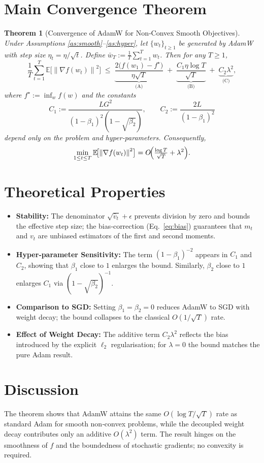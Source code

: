\documentclass{article}
\newtheorem{theorem}{Theorem}
\newcommand{\EE}{\mathbb{E}}
\newcommand{\norm}[1]{\left\|#1\right\|}
\begin{document}
\section*{Main Convergence Theorem}
\begin{theorem}[Convergence of AdamW for Non‑Convex Smooth Objectives]\label{thm:main}
Under Assumptions \ref{as:smooth}–\ref{as:hyper}, let $\{w_t\}_{t\ge1}$ be generated by AdamW with step size $\eta_t=\eta/\sqrt{t}$.
Define $\displaystyle \bar w_T:=\frac{1}{T}\sum_{t=1}^{T} w_t$.
Then for any $T\ge 1$,
\[
\frac{1}{T}\sum_{t=1}^{T}\EE\!\bigl[\norm{\nabla f(w_t)}^2\bigr]
\;\le\;
\underbrace{\frac{2\bigl(f(w_1)-f^\star\bigr)}{\eta\sqrt{T}}}_{\text{(A)}}
\;+\;
\underbrace{\frac{C_1\eta\log T}{\sqrt{T}}}_{\text{(B)}}
\;+\;
\underbrace{C_2\lambda^2}_{\text{(C)}},
\]
where $f^\star:=\inf_{w}f(w)$ and the constants
\[
C_1:=\frac{L G^2}{(1-\beta_1)^2(1-\sqrt{\beta_2})},\qquad 
C_2:=\frac{2L}{(1-\beta_1)^2}
\]
depend only on the problem and hyper‑parameters.
Consequently,
\[
\min_{1\le t\le T}\EE\!\bigl[\norm{\nabla f(w_t)}^2\bigr]=O\!\Bigl(\tfrac{\log T}{\sqrt{T}}+ \lambda^2\Bigr).
\]
\end{theorem}

\section*{Theoretical Properties}
\begin{itemize}[leftmargin=*]
\item \textbf{Stability:} The denominator $\sqrt{\hat v_t}+\epsilon$ prevents division by zero and bounds the effective step size; the bias‑correction (Eq.~\ref{eq:bias}) guarantees that $m_t$ and $v_t$ are unbiased estimators of the first and second moments.
\item \textbf{Hyper‑parameter Sensitivity:} The term $(1-\beta_1)^{-2}$ appears in $C_1$ and $C_2$, showing that $\beta_1$ close to $1$ enlarges the bound. Similarly, $\beta_2$ close to $1$ enlarges $C_1$ via $(1-\sqrt{\beta_2})^{-1}$.
\item \textbf{Comparison to SGD:} Setting $\beta_1=\beta_2=0$ reduces AdamW to SGD with weight decay; the bound collapses to the classical $O(1/\sqrt{T})$ rate.
\item \textbf{Effect of Weight Decay:} The additive term $C_2\lambda^2$ reflects the bias introduced by the explicit $\ell_2$ regularisation; for $\lambda=0$ the bound matches the pure Adam result.
\end{itemize}

\section*{Discussion}
The theorem shows that AdamW attains the same $O(\log T/\sqrt{T})$ rate as standard Adam for smooth non‑convex problems, while the decoupled weight decay contributes only an additive $O(\lambda^2)$ term. The result hinges on the smoothness of $f$ and the boundedness of stochastic gradients; no convexity is required.
\end{document}
